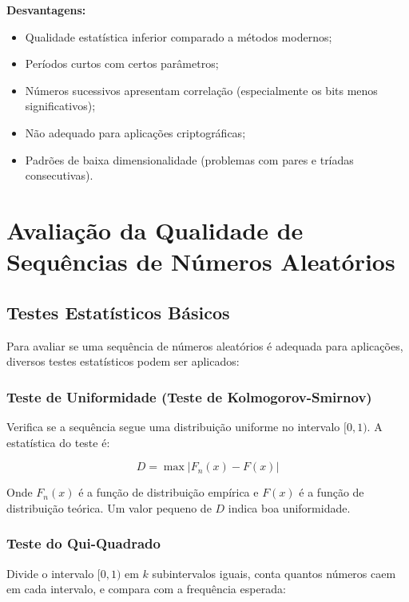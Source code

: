 \documentclass[12pt,a4paper]{article}
\begin{document}
\textbf{Desvantagens:}
\begin{itemize}
    \item Qualidade estatística inferior comparado a métodos modernos;
    \item Períodos curtos com certos parâmetros;
    \item Números sucessivos apresentam correlação (especialmente os bits menos significativos);
    \item Não adequado para aplicações criptográficas;
    \item Padrões de baixa dimensionalidade (problemas com pares e tríadas consecutivas).
\end{itemize}

\newpage

\section{Avaliação da Qualidade de Sequências de Números Aleatórios}

\subsection{Testes Estatísticos Básicos}

Para avaliar se uma sequência de números aleatórios é adequada para aplicações, diversos testes estatísticos podem ser aplicados:

\subsubsection{Teste de Uniformidade (Teste de Kolmogorov-Smirnov)}

Verifica se a sequência segue uma distribuição uniforme no intervalo $[0, 1)$. A estatística do teste é:

\begin{equation}
D = \max|F_n(x) - F(x)|
\end{equation}

Onde $F_n(x)$ é a função de distribuição empírica e $F(x)$ é a função de distribuição teórica. Um valor pequeno de $D$ indica boa uniformidade.

\subsubsection{Teste do Qui-Quadrado}

Divide o intervalo $[0, 1)$ em $k$ subintervalos iguais, conta quantos números caem em cada intervalo, e compara com a frequência esperada:
\end{document}
